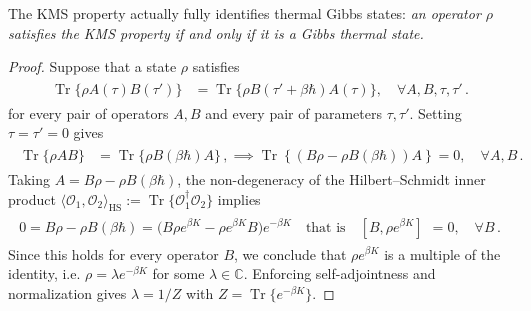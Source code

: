 \documentclass[../QFT_main.tex]{subfiles}
\begin{document}
\begin{mytheorem}
%
The KMS property actually fully identifies thermal Gibbs states: \emph{an operator $\rho$ satisfies the KMS property if and only if it is a Gibbs thermal state.}
\end{mytheorem}
\begin{proof}
Suppose that a state $\rho$ satisfies
{\small\begin{align}\begin{aligned}
    \operatorname{Tr}\{\rho A(\tau)B(\tau')\}
    &=
    \operatorname{Tr}\{\rho B(\tau'+\beta\hbar)A(\tau)\}, \quad \forall A,B,\tau,\tau'\,.
\end{aligned}\end{align}}
for every pair of operators $A,B$ and every pair of parameters $\tau,\tau'$.
Setting $\tau=\tau'=0$ gives
{\small\begin{align}\begin{aligned}
    \operatorname{Tr}\{\rho AB\}
    &=
    \operatorname{Tr}\{\rho B(\beta\hbar)A\}\,,
    \implies
    \operatorname{Tr}\left\{
        \left(B\rho-\rho B(\beta\hbar)\right)A
    \right\}
    =0, \quad \forall A,B\,.
\end{aligned}\end{align}}
Taking $A=B\rho-\rho B(\beta\hbar)$, the non-degeneracy of the Hilbert--Schmidt inner product $\langle \mathcal{O}_1,\mathcal{O}_2\rangle_{\text{HS}}:=\operatorname{Tr}\{ \mathcal{O}_1^\dagger \mathcal{O}_2 \}$ implies 
{\small\begin{align}\begin{aligned}
    0=B\rho-\rho B(\beta\hbar)=\big(B\rho e^{\beta K}-\rho e^{\beta K}B\big)e^{-\beta K}
    \quad \text{that is}\quad 
    [B,\rho e^{\beta K}]&=0, \quad\forall B\,. 
\end{aligned}\end{align}}
Since this holds for every operator $B$, we conclude that $\rho e^{\beta K}$ is a multiple of the identity, i.e. $\rho = \lambda e^{-\beta K}$ for some $\lambda\in\mathbb{C}$.
Enforcing self-adjointness and normalization gives $\lambda=1/Z$ with $Z=\operatorname{Tr}\{e^{-\beta K}\}$.  
\end{proof}
\end{document}
